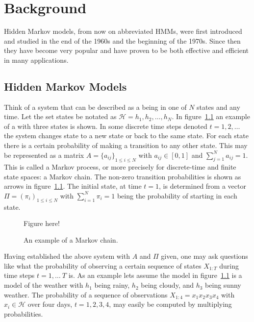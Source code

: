 
\chapter{Background}
\label{cha:background}


Hidden Markov models, from now on abbreviated HMMs, were first introduced and
studied in the end of the 1960s and the beginning of the 1970s. Since then they
have become very popular and have proven to be both effective and efficient in
many applications. 

\section{Hidden Markov Models}
\label{sec:hidden-markov-models}

Think of a system that can be described as a being in one of $N$ states and any
time. Let the set states be notated as $\mathcal{H} = {h_1, h_2, \dots, h_N}$.
In figure~\ref{fig:markov-chain} an example of a with three states is shown. In
some discrete time steps denoted $t = 1, 2, \dots$ the system changes state to
a new state or back to the same state. For each state there is a certain
probability of making a transition to any other state. This may be represented
as a matrix $A = {\{a_{ij}\}}_{1 \le i \le N}$ with $a_{ij} \in [0, 1]$ and
$\sum_{j = 1}^N a_{ij} = 1$. This is called a Markov process, or more precisely
for discrete-time and finite state spaces: a Markov chain. The non-zero
transition probabilities is shown as arrows in
figure~\ref{fig:markov-chain}. The initial state, at time $t = 1$, is
determined from a vector $\Pi = {(\pi_i)}_{1 \le i \le N}$ with
$\sum_{i=1}^N \pi_i = 1$ being the probability of starting in each state.

\begin{figure}
  \centering
  Figure here!
  \caption{An example of a Markov chain.}
  \label{fig:markov-chain}
\end{figure}

Having established the above system with $A$ and $\Pi$ given, one may ask
questions like what the probability of observing a certain sequence of states
$X_{1:T}$ during time steps $t = 1, \dots\ T$ is. As an example lets assume the
model in figure~\ref{fig:markov-chain} is a model of the weather with $h_1$
being rainy, $h_2$ being cloudy, and $h_3$ being sunny weather. The probability
of a sequence of observations $X_{1:4} = x_1x_2x_3x_4$ with
$x_i \in \mathcal{H}$ over four days, $t = 1, 2, 3, 4$, may easily be computed
by multiplying probabilities.

